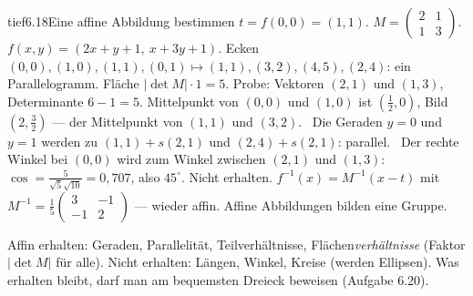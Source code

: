 \begin{loesungkarte}{tief}{6.18}{Eine affine Abbildung bestimmen}
$t = f(0, 0) = (1, 1)$. $M = \begin{pmatrix}2 & 1\\ 1 & 3\end{pmatrix}$. $f(x, y) = (2x + y + 1,\ x + 3y + 1)$.
Ecken $(0, 0), (1, 0), (1, 1), (0, 1)\mapsto(1, 1), (3, 2), (4, 5), (2, 4)$: ein Parallelogramm. Fläche $|\det M|\cdot1 = 5$. Probe: Vektoren $(2, 1)$ und $(1, 3)$, Determinante $6 - 1 = 5$. \checkmark
{}
Mittelpunkt von $(0, 0)$ und $(1, 0)$ ist $(\frac12, 0)$, Bild $(2, \frac32)$ --- der Mittelpunkt von $(1, 1)$ und $(3, 2)$. \checkmark\ Die Geraden $y = 0$ und $y = 1$ werden zu $(1, 1) + s(2, 1)$ und $(2, 4) + s(2, 1)$: parallel. \checkmark\ Der rechte Winkel bei $(0, 0)$ wird zum Winkel zwischen $(2, 1)$ und $(1, 3)$: $\cos = \frac5{\sqrt5\sqrt{10}} = 0{,}707$, also $45^{\circ}$. Nicht erhalten.
$f^{-1}(x) = M^{-1}(x - t)$ mit $M^{-1} = \frac15\begin{pmatrix}3 & -1\\ -1 & 2\end{pmatrix}$ --- wieder affin. Affine Abbildungen bilden eine Gruppe.
\begin{mitnehmen}\kastentext
Affin erhalten: Geraden, Parallelität, Teilverhältnisse, Flächen\emph{verhältnisse} (Faktor $|\det M|$ für alle). Nicht erhalten: Längen, Winkel, Kreise (werden Ellipsen). Was erhalten bleibt, darf man am bequemsten Dreieck beweisen (Aufgabe 6.20).
\end{mitnehmen}
\end{loesungkarte}

